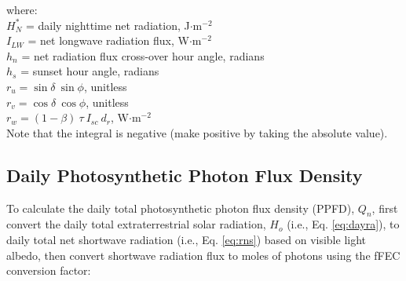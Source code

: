 \noindent where: \\
\indent $H_N^{\ast}$ = daily nighttime net radiation, J$\cdot$m$^{-2}$\\
\indent $I_{LW}$ = net longwave radiation flux, W$\cdot$m$^{-2}$\\
\indent $h_n$ = net radiation flux cross-over hour angle, radians\\
\indent $h_s$ = sunset hour angle, radians\\
\indent $r_u = \sin\delta\: \sin\phi$, unitless \\
\indent $r_v = \cos\delta\: \cos\phi$, unitless \\
\indent $r_w = \left(1-\beta\right)\:\tau\: I_{sc}\: d_r$, W$\cdot$m$^{-2}$\\

\noindent Note that the integral is negative (make positive by taking the absolute value).

\subsection{Daily Photosynthetic Photon Flux Density}
\label{sec:dppfd}
To calculate the daily total photosynthetic photon flux density (PPFD), $Q_n$, first convert the daily total extraterrestrial solar radiation, $H_o$ (i.e., Eq. \ref{eq:dayra}), to daily total net shortwave radiation (i.e., Eq. \ref{eq:rns}) based on visible light albedo, then convert shortwave radiation flux to moles of photons using the fFEC conversion factor:

